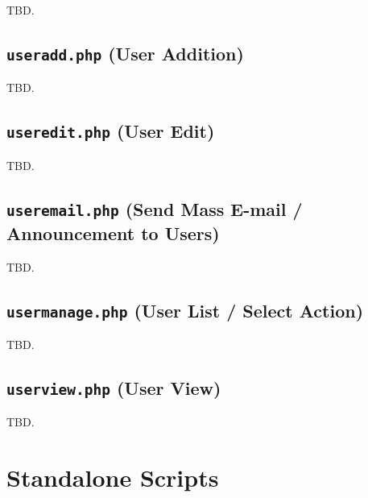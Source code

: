 \documentclass[letterpaper,10pt,titlepage]{article}
\begin{document}
TBD.


\subsection{\texttt{useradd.php} (User Addition)}
\label{swpg0:susd0}

TBD.


\subsection{\texttt{useredit.php} (User Edit)}
\label{swpg0:suse0}

TBD.


\subsection{\texttt{useremail.php} (Send Mass E-mail / Announcement to Users)}
\label{swpg0:seus0}

TBD.


\subsection{\texttt{usermanage.php} (User List / Select Action)}
\label{swpg0:sumg0}

TBD.


\subsection{\texttt{userview.php} (User View)}
\label{swpg0:suvw0}

TBD.


\section{Standalone Scripts}
\label{ssas0}
\end{document}
